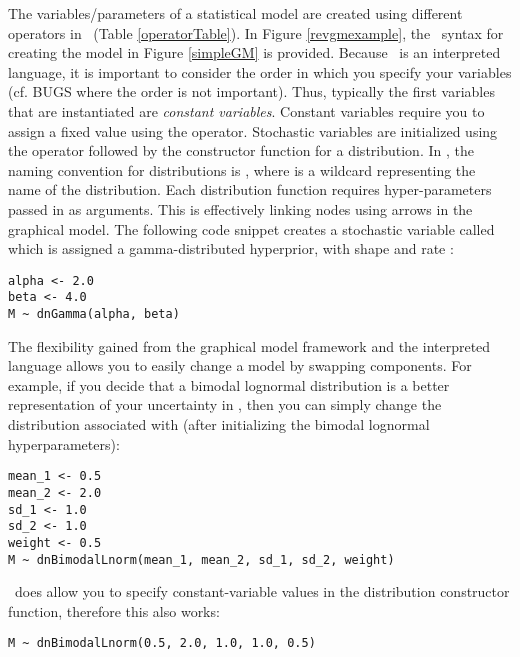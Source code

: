 The variables/parameters of a statistical model are created using different operators in \Rev~(Table \ref{operatorTable}). 
In Figure \ref{revgmexample}, the \Rev~syntax for creating the model in Figure \ref{simpleGM} is provided.
Because \Rev~is an interpreted language, it is important to consider the order in which you specify your variables (cf. BUGS where the order is not important). 
Thus, typically the first variables that are instantiated are \emph{constant variables}. 
Constant variables require you to assign a fixed value using the \cl{<-} operator. 
Stochastic variables are initialized using the \cl{\rbdn} operator followed by the constructor function for a distribution. 
In \Rev, the naming convention for distributions is , where \cl{*} is a wildcard representing the name of the distribution. 
Each distribution function requires hyper-parameters passed in as arguments. 
This is effectively linking nodes using arrows in the graphical model.
The following code snippet creates a stochastic variable called  which is assigned a gamma-distributed hyperprior, with shape  and rate :
{\tt \begin{snugshade*}
\begin{lstlisting}
alpha <- 2.0
beta <- 4.0
M ~ dnGamma(alpha, beta)
\end{lstlisting}
\end{snugshade*}}

The flexibility gained from the graphical model framework and the interpreted language allows you to easily change a model by swapping components. 
For example, if you decide that a bimodal lognormal distribution is a better representation of your uncertainty in , then you can simply change the distribution associated with  (after initializing the bimodal lognormal hyperparameters):
{\tt \begin{snugshade*}
\begin{lstlisting}
mean_1 <- 0.5
mean_2 <- 2.0
sd_1 <- 1.0
sd_2 <- 1.0
weight <- 0.5
M ~ dnBimodalLnorm(mean_1, mean_2, sd_1, sd_2, weight)
\end{lstlisting}
\end{snugshade*}}

\Rev~does allow you to specify constant-variable values in the distribution constructor function, therefore this also works:
{\tt \begin{snugshade*}
\begin{lstlisting}
M ~ dnBimodalLnorm(0.5, 2.0, 1.0, 1.0, 0.5)
\end{lstlisting}
\end{snugshade*}}



